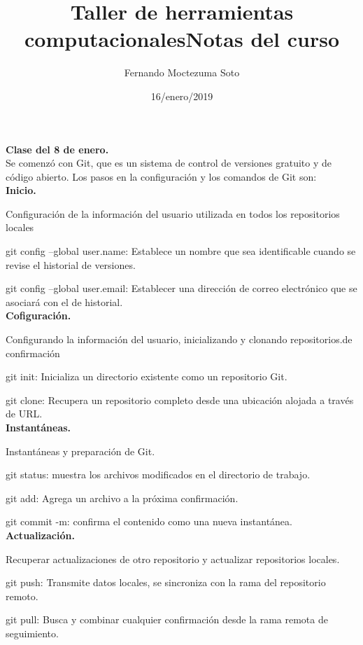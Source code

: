 \documentclass[etterpaper, 12pt, oneside]{article}%
\title{\Huge Taller de herramientas computacionales}
\author{Fernando Moctezuma Soto}
\date{16/enero/2019}
\begin{document}
	\maketitle
	
	\newpage
	
	\title{\Huge Notas del curso\\}
	
	\textbf{Clase del 8 de enero.}\\
	
	Se comenzó con Git, que es un sistema de control de versiones gratuito y de código abierto. Los pasos en la configuración y los comandos de Git son:\\

	
	\textbf{Inicio.}
	
	Configuración de la información del usuario utilizada en todos los repositorios locales
	
	git config --global user.name:
	Establece un nombre que sea identificable cuando se revise el historial de versiones.
	
	git config --global user.email:
	Establecer una dirección de correo electrónico que se asociará con el de historial.\\
	
	\textbf{Cofiguración.}
	
	Configurando la información del usuario, inicializando y clonando repositorios.de confirmación
	
	git init:
	Inicializa un directorio existente como un repositorio Git.
	
	git clone:
	Recupera un repositorio completo desde una ubicación alojada a través de URL.\\
	
	\textbf{Instantáneas.}
	
	Instantáneas y preparación de Git.
	
	git status:
	muestra los archivos modificados en el directorio de trabajo.
	
	git add:
	Agrega un archivo a la próxima confirmación.
	
	git commit -m: 
	confirma el contenido como una nueva instantánea.\\
	
	\textbf{Actualización.}
	
	Recuperar actualizaciones de otro repositorio y actualizar repositorios locales.
	
	git push:
	Transmite datos locales, se sincroniza con la rama del repositorio remoto.
	
	git pull:
	Busca y combinar cualquier confirmación desde la rama remota de seguimiento.
	
\end{document}
